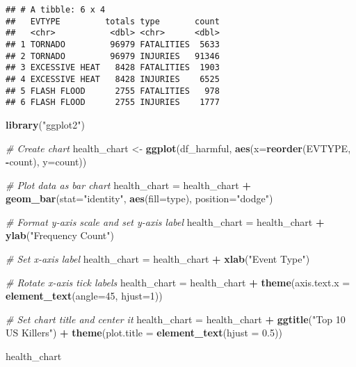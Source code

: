 \documentclass[
]{article}
\newenvironment{Shaded}{\begin{snugshade}}{\end{snugshade}}
\newcommand{\AttributeTok}[1]{\textcolor[rgb]{0.13,0.29,0.53}{#1}}
\newcommand{\CommentTok}[1]{\textcolor[rgb]{0.56,0.35,0.01}{\textit{#1}}}
\newcommand{\DecValTok}[1]{\textcolor[rgb]{0.00,0.00,0.81}{#1}}
\newcommand{\FloatTok}[1]{\textcolor[rgb]{0.00,0.00,0.81}{#1}}
\newcommand{\FunctionTok}[1]{\textcolor[rgb]{0.13,0.29,0.53}{\textbf{#1}}}
\newcommand{\NormalTok}[1]{#1}
\newcommand{\OtherTok}[1]{\textcolor[rgb]{0.56,0.35,0.01}{#1}}
\newcommand{\SpecialCharTok}[1]{\textcolor[rgb]{0.81,0.36,0.00}{\textbf{#1}}}
\newcommand{\StringTok}[1]{\textcolor[rgb]{0.31,0.60,0.02}{#1}}
\begin{document}
\begin{verbatim}
## # A tibble: 6 x 4
##   EVTYPE         totals type       count
##   <chr>           <dbl> <chr>      <dbl>
## 1 TORNADO         96979 FATALITIES  5633
## 2 TORNADO         96979 INJURIES   91346
## 3 EXCESSIVE HEAT   8428 FATALITIES  1903
## 4 EXCESSIVE HEAT   8428 INJURIES    6525
## 5 FLASH FLOOD      2755 FATALITIES   978
## 6 FLASH FLOOD      2755 INJURIES    1777
\end{verbatim}

\begin{Shaded}
\begin{Highlighting}[]
\FunctionTok{library}\NormalTok{(}\StringTok{"ggplot2"}\NormalTok{)}

\CommentTok{\# Create chart}
\NormalTok{health\_chart }\OtherTok{\textless{}{-}} \FunctionTok{ggplot}\NormalTok{(df\_harmful, }\FunctionTok{aes}\NormalTok{(}\AttributeTok{x=}\FunctionTok{reorder}\NormalTok{(EVTYPE, }\SpecialCharTok{{-}}\NormalTok{count), }\AttributeTok{y=}\NormalTok{count))}

\CommentTok{\# Plot data as bar chart}
\NormalTok{health\_chart }\OtherTok{=}\NormalTok{ health\_chart }\SpecialCharTok{+} \FunctionTok{geom\_bar}\NormalTok{(}\AttributeTok{stat=}\StringTok{"identity"}\NormalTok{, }\FunctionTok{aes}\NormalTok{(}\AttributeTok{fill=}\NormalTok{type), }\AttributeTok{position=}\StringTok{"dodge"}\NormalTok{)}

\CommentTok{\# Format y{-}axis scale and set y{-}axis label}
\NormalTok{health\_chart }\OtherTok{=}\NormalTok{ health\_chart }\SpecialCharTok{+} \FunctionTok{ylab}\NormalTok{(}\StringTok{"Frequency Count"}\NormalTok{) }

\CommentTok{\# Set x{-}axis label}
\NormalTok{health\_chart }\OtherTok{=}\NormalTok{ health\_chart }\SpecialCharTok{+} \FunctionTok{xlab}\NormalTok{(}\StringTok{"Event Type"}\NormalTok{) }

\CommentTok{\# Rotate x{-}axis tick labels }
\NormalTok{health\_chart }\OtherTok{=}\NormalTok{ health\_chart }\SpecialCharTok{+} \FunctionTok{theme}\NormalTok{(}\AttributeTok{axis.text.x =} \FunctionTok{element\_text}\NormalTok{(}\AttributeTok{angle=}\DecValTok{45}\NormalTok{, }\AttributeTok{hjust=}\DecValTok{1}\NormalTok{))}

\CommentTok{\# Set chart title and center it}
\NormalTok{health\_chart }\OtherTok{=}\NormalTok{ health\_chart }\SpecialCharTok{+} \FunctionTok{ggtitle}\NormalTok{(}\StringTok{"Top 10 US Killers"}\NormalTok{) }\SpecialCharTok{+} \FunctionTok{theme}\NormalTok{(}\AttributeTok{plot.title =} \FunctionTok{element\_text}\NormalTok{(}\AttributeTok{hjust =} \FloatTok{0.5}\NormalTok{))}

\NormalTok{health\_chart}
\end{Highlighting}
\end{Shaded}
\end{document}
